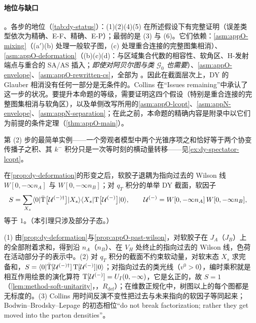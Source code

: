 \paragraph{地位与缺口}\tagA。各步的地位（\cref{tab:dy-status}）：(1)(2)(4)(5) 在所述假设下有完整证明（误差类型依次为精确、E-F、精确、E-P）；最弱的是 (3) 与 (6)。它们依赖：\cref{asm:appO-mixing}（(a$'$)(b) 处理一般软子图，(c) 处理重合连接的完整图集相消）、\cref{asm:appO-deformation}（(b)(c)(d)：与区域集合代数的相容性、软角区、H-发射端点与重合的 SA/AS 插入；\emph{即使对阿贝尔图与类 $\mathcal G_0$ 也需要}）、\cref{asm:appO-envelope}、\cref{asm:appO-rewritten-cs}，全部为 \tagA。因此在截面层次上，DY 的 Glauber 相消没有任何一部分是无条件的。Collins 在“Issues remaining”中承认了这一步的状况\cite[第~14.4.8~节]{Collins2011}。要提升本命题的等级，需要证明这四个假设（特别是重合连接的完整图集相消与软角区），以及单侧改写所用的\cref{asm:appO-lcopt}、\cref{asm:appN-envelope}、\cref{asm:appN-separation}；在此之前，本命题的精确内容是附录中以它们为前提的条件定理（\cref{thm:appO-main}）。

第 (2) 步的最简单实例——一个旁观者模型中两个光锥序项之和恰好等于两个协变传播子之积、其 $k^-$ 积分只是一次等时刻的横动量转移——见\cref{ex:dy-spectator-lcopt}。

\begin{lemma}\label{lem:dy-soft}
在\cref{prop:dy-deformation}的形变之后，软胶子退耦为指向过去的 Wilson 线 $W[0,-\infty n_A]$ 与 $W[0,-\infty n_B]$；对 $q_T$ 积分的单举 DY 截面，软因子
\[
S=\sum_{X_s}\langle0|\bar{\rm T}\big[\mathcal U^{(-)\dagger}\big]|X_s\rangle\langle X_s|{\rm T}\big[\mathcal U^{(-)}\big]|0\rangle,\qquad
\mathcal U^{(-)}=W[0,-\infty n_A]\,W[0,-\infty n_B],
\]
等于 $1$。（本引理只涉及部分子态。）
\end{lemma}

\begin{proofsketch}
(1) 由\cref{prop:dy-deformation}与\cref{prop:appO-past-wilson}，对软胶子在 $J_A$（$J_B$）上的全部附着求和，得到沿 $n_A$（$n_B$）、在 $V_H$ 处终止的指向过去的 Wilson 线，色荷在活动部分子的表示中。(2) 对 $q_T$ 积分的截面不约束软动量，对软末态 $X_s$ 求完备和，$S=\langle0|\bar{\rm T}[\mathcal U^{(-)\dagger}]\,{\rm T}[\mathcal U^{(-)}]|0\rangle$；对指向过去的类光线（$v^0>0$），编时乘积就是相互作用绘景的演化算符 ${\rm T}[\mathcal U^{(-)}]=U_I(0,-\infty)$，它是幺正的，故 $S=1$（\cref{lem:method-soft-unitarity}，\tagR，$R_{\mathrm{def}}$）；在维数正规化中，树图以上的每个图都是无标度的。(3) Collins 用时间反演不变性把过去与未来指向的软因子等同起来\cite[第~13.17~节与第~14.4.6~节]{Collins2011}；Bodwin--Brodsky--Lepage 的初态相位\cite{BodwinBrodskyLepage1981}“do not break factorization; rather they get moved into the parton densities”\cite[第~14.4.7~节]{Collins2011}。
\end{proofsketch}

